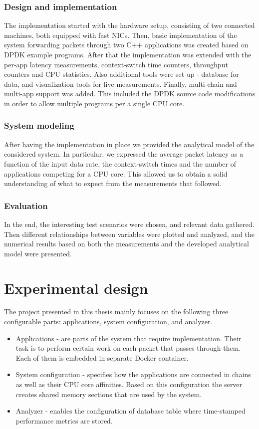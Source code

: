 \documentclass[english]{kththesis}
\begin{document}
\subsubsection{Design and implementation}
The implementation started with the hardware setup, consisting of two connected machines, both equipped with fast \glspl{NIC}. Then, basic implementation of the system forwarding packets through two C++ applications was created based on \gls{DPDK} example programs. After that the implementation was extended with the per-app latency measurements, context-switch time counters, throughput counters and CPU statistics. Also additional tools were set up - database for data, and visualization tools for live measurements. Finally, multi-chain and multi-app support was added. This included the \gls{DPDK} source code modifications in order to allow multiple programs per a single CPU core.

\subsubsection{System modeling}
After having the implementation in place we provided the analytical model of the considered system. In particular, we expressed the average packet latency as a function of the input data rate, the context-switch times and the number of applications competing for a CPU core. This allowed us to obtain a solid understanding of what to expect from the measurements that followed.

\subsubsection{Evaluation}
In the end, the interesting test scenarios were chosen, and relevant data gathered. Then different relationships between variables were plotted and analyzed, and the numerical results based on both the measurements and the developed analytical model were presented.

\section{Experimental design}
The project presented in this thesis mainly focuses on the following three configurable parts: applications, system configuration, and analyzer.

\begin{itemize}
    \item Applications - are parts of the system that require implementation. Their task is to perform certain work on each packet that passes through them. Each of them is embedded in separate Docker container.
    \item System configuration - specifies how the applications are connected in chains as well as their CPU core affinities. Based on this configuration the server creates shared memory sections that are used by the system.
    \item Analyzer - enables the configuration of database table where time-stamped performance metrics are stored.
\end{itemize}
\end{document}
